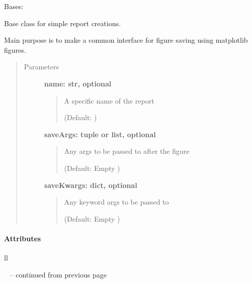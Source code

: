 \documentclass[letterpaper,10pt,english]{sphinxmanual}
\begin{document}

\begin{fulllineitems}
\label{fseq.reporting:fseq.reporting.reports.ReportBase}
Bases: 

Base class for simple report creations.

Main purpose is to make a common interface for figure saving using
matplotlib figures.
\begin{quote}\begin{description}
\item[{Parameters}] \leavevmode
\textbf{name: str, optional}
\begin{quote}

A specific name of the report

(Default: )
\end{quote}

\textbf{saveArgs: tuple or list, optional}
\begin{quote}

Any args to be passed to  after the figure

(Default: Empty )
\end{quote}

\textbf{saveKwargs: dict, optional}
\begin{quote}

Any keyword args to be passed to 

(Default: Empty )
\end{quote}

\end{description}\end{quote}
\paragraph{Attributes}

\begin{longtable}{ll}
\hline
\endfirsthead

%
{{\textsf{\tablename\ \thetable{} -- continued from previous page}}} \\
\hline
\endhead

\hline {} \\ \hline
\endfoot


\end{longtable}
\end{fulllineitems}
\end{document}
